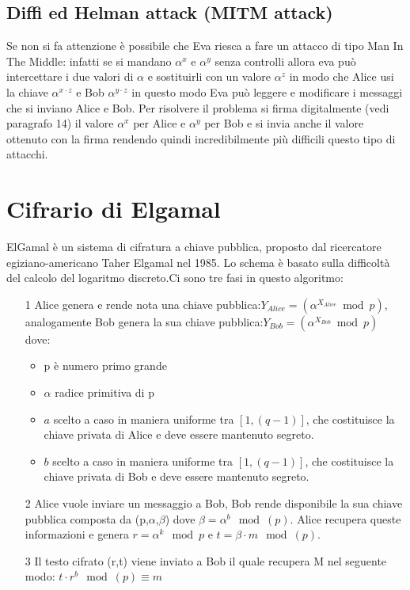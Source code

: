 \documentclass[10pt,a4paper]{article}
\begin{document}
\subsection{Diffi ed  Helman attack (MITM attack)}
Se non si fa attenzione è possibile che Eva riesca a fare un attacco di tipo Man In The Middle: infatti se si mandano $\alpha^x$ e $\alpha^y$ senza controlli allora eva può intercettare i due valori di $\alpha$ e sostituirli con un valore $\alpha^z$ in modo che Alice usi la chiave $\alpha^{x\cdot z}$ e Bob $\alpha^{y\cdot z}$ in questo modo Eva può leggere e modificare i messaggi che si inviano Alice e Bob. Per risolvere il problema si firma digitalmente (vedi paragrafo 14) il valore $\alpha^x$ per Alice e $\alpha^y$ per Bob e si invia anche il valore ottenuto con la firma rendendo quindi incredibilmente più difficili questo tipo di attacchi.

\section{Cifrario di Elgamal}
ElGamal è un sistema di cifratura a chiave pubblica, proposto dal ricercatore egiziano-americano Taher Elgamal nel 1985. Lo schema è basato sulla difficoltà del calcolo del logaritmo discreto.Ci sono tre fasi in questo algoritmo:
\begin{itemize}
\item[1] Alice genera e rende nota una chiave pubblica:$Y_{Alice} = (\alpha^{X_{Alice}} \bmod p)$, analogamente Bob genera la sua chiave pubblica:$Y_{Bob} = (\alpha^{X_{Bob}} \bmod p)$ dove:
\begin{itemize}
\item p è numero primo grande
\item $\alpha$ radice primitiva di p
\item $a$ scelto a caso in maniera uniforme tra $[1,(q-1)]$, che costituisce la chiave privata di Alice e deve essere mantenuto segreto.
\item $b$ scelto a caso in maniera uniforme tra $[1,(q-1)]$, che costituisce la chiave privata di Bob e deve essere mantenuto segreto.
\end{itemize} 
\item[2] Alice vuole inviare un messaggio a Bob, Bob rende disponibile la sua chiave pubblica composta da (p,$\alpha$,$\beta$) dove $\beta = \alpha^b \mod(p)$. Alice recupera queste informazioni e genera $r=\alpha^k\mod p$ e $t=\beta\cdot m \mod(p)$.
\item[3] Il testo cifrato (r,t) viene inviato a Bob il quale recupera M nel seguente modo: $t\cdot r^b \mod(p) \equiv m$ 
\end{itemize}
\end{document}
